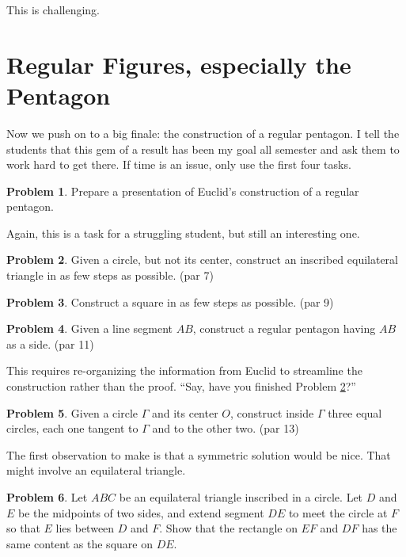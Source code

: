 \documentclass{tufte-handout}
\theoremstyle{definition}
\newtheorem{problem}{Problem}[section]
\begin{document}
This is challenging. 

\clearpage
\setcounter{section}{15}
\setcounter{problem}{0}
\section{Regular Figures, especially the Pentagon}

Now we push on to a big finale: the construction of a regular pentagon. I tell the students that this gem of a result has been my goal all semester and ask them to work hard to get there. If time is an issue, only use the first four tasks.

\begin{problem}\label{prob:GSP-reg-pentagon}
Prepare a presentation of Euclid's construction of a regular pentagon.
\end{problem}

Again, this is a task for a struggling student, but still an interesting one.

\begin{problem}\label{prob:circle-inscribe-triangle} Given a circle, but not its center, construct an inscribed equilateral triangle in as few steps as possible. (par 7)
\end{problem}

\begin{problem}\label{prob:square}
Construct a square in as few steps as possible. (par 9)
\end{problem}

\begin{problem}\label{prob:side-reg-pent}
Given a line segment $AB$, construct a regular pentagon having $AB$ as a side. (par 11)
\end{problem}

This requires re-organizing the information from Euclid to streamline the construction rather than the proof. ``Say, have you finished Problem \ref{prob:circle-inscribe-triangle}?''

\begin{problem}\label{prob:circle-three-tangent-circles}
Given a circle $\Gamma$ and its center $O$, construct inside $\Gamma$ three equal circles, each one tangent to $\Gamma$ and to the other two. (par 13)
\end{problem}

The first observation to make is that a symmetric solution would be nice. That might involve an equilateral triangle.

\begin{problem}\label{prob:inscribed-circle-content}
Let $ABC$ be an equilateral triangle inscribed in a circle. Let $D$ and $E$ be the midpoints of two sides, and extend segment $DE$ to meet the circle at $F$ so that $E$ lies between $D$ and $F$. Show that the rectangle on $EF$ and $DF$ has the same content as the square on $DE$.
\end{problem}
\end{document}
